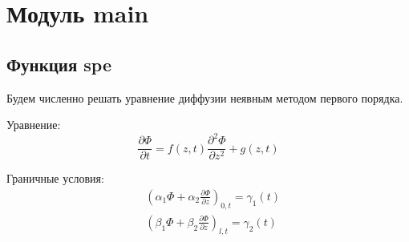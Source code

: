 \section{Модуль main}
\subsection{Функция spe}

Будем численно решать уравнение диффузии неявным методом первого порядка.

Уравнение:
\begin{equation}
    \label{eq:}
    \frac{\partial \Phi}{\partial t} =
    f(z, t) \frac{\partial^2 \Phi}{\partial z^2} + g(z, t)
\end{equation}

Граничные условия:
\begin{align}
        & \left(\alpha_1 \Phi + \alpha_2 \frac{\partial \Phi}{\partial z}\right)_{0, t} = \gamma_1(t) \\
        & \left(\beta_1 \Phi + \beta_2 \frac{\partial \Phi}{\partial z}\right)_{l, t} = \gamma_2(t) \\
\end{align}
